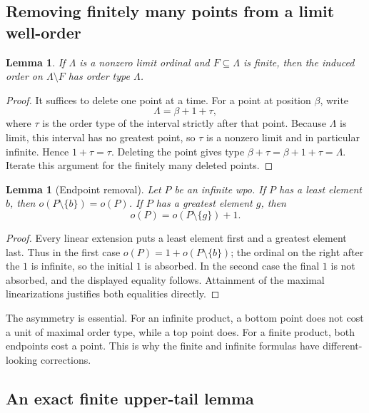 \documentclass[11pt,letterpaper]{article}
\newtheorem{lemma}[theorem]{Lemma}
\theoremstyle{definition}
\theoremstyle{remark}
\begin{document}
\subsection{Removing finitely many points from a limit well-order}

\begin{lemma}\label{lem:finite-removal-ordinal}
If $\Lambda$ is a nonzero limit ordinal and $F\subseteq\Lambda$ is finite,
then the induced order on $\Lambda\setminus F$ has order type $\Lambda$.
\end{lemma}
\begin{proof}
It suffices to delete one point at a time. For a point at position $\beta$,
write
\[
 \Lambda=\beta+1+\tau,
\]
where $\tau$ is the order type of the interval strictly after that point.
Because $\Lambda$ is limit, this interval has no greatest point, so $\tau$
is a nonzero limit and in particular infinite. Hence $1+\tau=\tau$.
Deleting the point gives type $\beta+\tau=\beta+1+\tau=\Lambda$.
Iterate this argument for the finitely many deleted points.
\end{proof}

\begin{lemma}[Endpoint removal]\label{lem:endpoint-removal}
Let $P$ be an infinite wpo.
If $P$ has a least element $b$, then $o(P\setminus\{b\})=o(P)$.
If $P$ has a greatest element $g$, then
\[
 o(P)=o(P\setminus\{g\})+1.
\]
\end{lemma}
\begin{proof}
Every linear extension puts a least element first and a greatest element
last. Thus in the first case
$o(P)=1+o(P\setminus\{b\})$; the ordinal on the right after the $1$ is
infinite, so the initial $1$ is absorbed. In the second case the final $1$
is not absorbed, and the displayed equality follows. Attainment of the
maximal linearizations justifies both equalities directly.
\end{proof}

The asymmetry is essential. For an infinite product, a bottom point does
not cost a unit of maximal order type, while a top point does. For a finite
product, both endpoints cost a point. This is why the finite and infinite
formulas have different-looking corrections.

\subsection{An exact finite upper-tail lemma}
\end{document}
